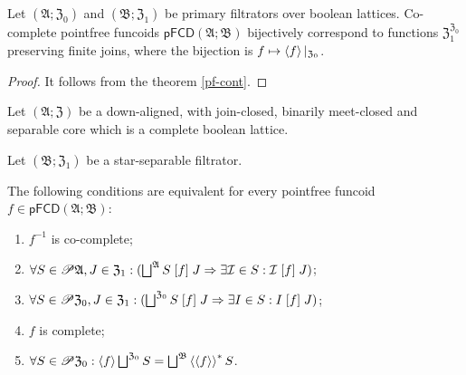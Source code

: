 \begin{prop}
Let $(\mathfrak{A};\mathfrak{Z}_{0})$ and $(\mathfrak{B};\mathfrak{Z}_{1})$
be primary filtrators over boolean lattices. Co-complete pointfree
funcoids $\mathsf{pFCD}(\mathfrak{A};\mathfrak{B})$ bijectively correspond
to functions $\mathfrak{Z}_{1}^{\mathfrak{Z}_{0}}$ preserving finite
joins, where the bijection is $f\mapsto\left\langle f\right\rangle|_{\mathfrak{Z}_{0}}$.\end{prop}
\begin{proof}
It follows from the theorem \ref{pf-cont}.\end{proof}
\begin{thm}
\label{pf-compl-conds}Let $(\mathfrak{A};\mathfrak{Z})$ be a down-aligned,
with join-closed, binarily meet-closed and separable core which is
a complete boolean lattice.

Let $(\mathfrak{B};\mathfrak{Z}_{1})$ be a star-separable filtrator.

The following conditions are equivalent for every pointfree funcoid
$f\in\mathsf{pFCD}(\mathfrak{A};\mathfrak{B})$:
\begin{enumerate}
\item \label{pf-ax:fcd-full-main}$f^{-1}$ is co-complete;
\item \label{pf-ax:fcd-full-fa-filt}$\forall S\in\mathscr{P}\mathfrak{A},J\in\mathfrak{Z}_{1}:(\bigsqcup^{\mathfrak{A}}S\mathrel{\left[f\right]}J\Rightarrow\exists\mathcal{I}\in S:\mathcal{I}\mathrel{\left[f\right]}J)$;
\item \label{pf-ax:fcd-full-fa-set}$\forall S\in\mathscr{P}\mathfrak{Z}_{0},J\in\mathfrak{Z}_{1}:(\bigsqcup^{\mathfrak{Z}_{0}}S\mathrel{\left[f\right]}J\Rightarrow\exists I\in S:I\mathrel{\left[f\right]}J)$;
\item \label{pf-ax:fcd-full-eq-filt}$f$ is complete;
\item \label{pf-ax:fcd-full-eq-set}$\forall S\in\mathscr{P}\mathfrak{Z}_{0}:\left\langle f\right\rangle\bigsqcup^{\mathfrak{Z}_{0}}S=\bigsqcup^{\mathfrak{B}}\left\langle \left\langle f\right\rangle\right\rangle ^{\ast}S$.
\end{enumerate}
\end{thm}
